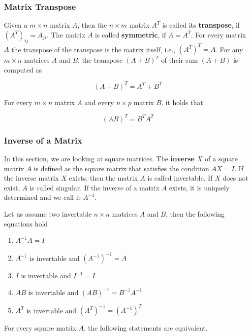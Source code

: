 \documentclass[
]{book}
\providecommand{\tightlist}{%
  \setlength{\itemsep}{0pt}\setlength{\parskip}{0pt}}
\begin{document}
\hypertarget{intro-linalg-laws-matrix-transpose}{%
\subsubsection{Matrix Transpose}\label{intro-linalg-laws-matrix-transpose}}

Given a \(m\times n\) matrix \(A\), then the \(n\times m\) matrix \(A^T\) is called its \textbf{transpose}, if \((A^T)_{ij} = A_{ji}\). The matrix \(A\) is called \textbf{symmetric}, if \(A = A^T\). For every matrix \(A\) the transpose of the transpose is the matrix itself, i.e., \((A^T)^T = A\). For any \(m\times n\) matrices \(A\) and \(B\), the transpose \((A+B)^T\) of their sum \((A+B)\) is computed as

\[(A+B)^T = A^T + B^T\]

For every \(m\times n\) matrix \(A\) and every \(n\times p\) matrix \(B\), it holds that

\[(AB)^T = B^T A^T\]

\hypertarget{intro-linalg-inverse-matrix}{%
\subsubsection{Inverse of a Matrix}\label{intro-linalg-inverse-matrix}}

In this section, we are looking at square matrices. The \textbf{inverse} \(X\) of a square matrix \(A\) is defined as the square matrix that satisfies the condition \(AX = I\). If the inverse matrix \(X\) exists, then the matrix \(A\) is called invertable. If \(X\) does not exist, \(A\) is called singular. If the inverse of a matrix \(A\) exists, it is uniquely determined and we call it \(A^{-1}\).

Let us assume two invertable \(n\times n\) matrices \(A\) and \(B\), then the following equations hold

\begin{enumerate}
\def\labelenumi{\arabic{enumi}.}
\tightlist
\item
  \(A^{-1}A = I\)
\item
  \(A^{-1}\) is invertable and \((A^{-1})^{-1} = A\)
\item
  \(I\) is invertable and \(I^{-1} = I\)
\item
  \(AB\) is invertable and \((AB)^{-1} = B^{-1}A^{-1}\)
\item
  \(A^T\) is invertable and \((A^T)^{-1} = (A^{-1})^T\)
\end{enumerate}

For every square matrix \(A\), the following statements are equivalent.
\end{document}
